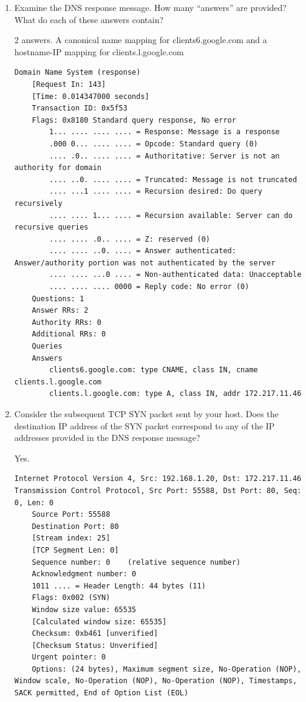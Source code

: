 \documentclass[letter,10pt]{article}
\begin{document}
\begin{enumerate}
\item Examine the DNS response message. How many “answers” are provided? What
do each of these answers contain?

2 answers. A canonical name mapping for clients6.google.com and a hostname-IP mapping for clients.l.google.com

\begin{lstlisting}[breaklines]
Domain Name System (response)
    [Request In: 143]
    [Time: 0.014347000 seconds]
    Transaction ID: 0x5f53
    Flags: 0x8180 Standard query response, No error
        1... .... .... .... = Response: Message is a response
        .000 0... .... .... = Opcode: Standard query (0)
        .... .0.. .... .... = Authoritative: Server is not an authority for domain
        .... ..0. .... .... = Truncated: Message is not truncated
        .... ...1 .... .... = Recursion desired: Do query recursively
        .... .... 1... .... = Recursion available: Server can do recursive queries
        .... .... .0.. .... = Z: reserved (0)
        .... .... ..0. .... = Answer authenticated: Answer/authority portion was not authenticated by the server
        .... .... ...0 .... = Non-authenticated data: Unacceptable
        .... .... .... 0000 = Reply code: No error (0)
    Questions: 1
    Answer RRs: 2
    Authority RRs: 0
    Additional RRs: 0
    Queries
    Answers
        clients6.google.com: type CNAME, class IN, cname clients.l.google.com
        clients.l.google.com: type A, class IN, addr 172.217.11.46
\end{lstlisting}

\item Consider the subsequent TCP SYN packet sent by your host. Does the destination
IP address of the SYN packet correspond to any of the IP addresses provided in
the DNS response message?

Yes.

\begin{lstlisting}[breaklines]
Internet Protocol Version 4, Src: 192.168.1.20, Dst: 172.217.11.46
Transmission Control Protocol, Src Port: 55588, Dst Port: 80, Seq: 0, Len: 0
    Source Port: 55588
    Destination Port: 80
    [Stream index: 25]
    [TCP Segment Len: 0]
    Sequence number: 0    (relative sequence number)
    Acknowledgment number: 0
    1011 .... = Header Length: 44 bytes (11)
    Flags: 0x002 (SYN)
    Window size value: 65535
    [Calculated window size: 65535]
    Checksum: 0xb461 [unverified]
    [Checksum Status: Unverified]
    Urgent pointer: 0
    Options: (24 bytes), Maximum segment size, No-Operation (NOP), Window scale, No-Operation (NOP), No-Operation (NOP), Timestamps, SACK permitted, End of Option List (EOL)


\end{lstlisting}
\end{enumerate}
\end{document}
